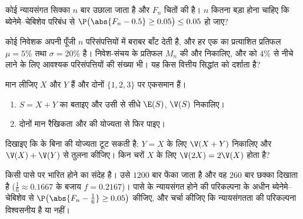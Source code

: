 \begin{exercise}[$\star$]\label{exo:g12:sums:3}
कोई न्यायसंगत सिक्का $n$ बार उछाला जाता है और $F_n$ चितों की  है। $n$ कितना बड़ा होना चाहिए कि ब्येनेमे--चेबिशेव परिबंध से $\P\bigl(\abs{F_n - 0.5} \geq 0.05\bigr) \leq 0.05$
हो जाए?
\end{exercise}

\begin{exercise}[$\star\star$]\label{exo:g12:sums:4}
कोई निवेशक अपनी पूँजी $n$  परिसंपत्तियों में बराबर बाँट देती है, और
हर एक का प्रत्याशित प्रतिफल $\mu = 5\%$ तथा  $\sigma = 20\%$ है। निवेश-संचय के
प्रतिफल $M_n$ की  और  निकालिए, और  को $4\%$ से
नीचे लाने के लिए आवश्यक परिसंपत्तियों की संख्या भी। यह किस वित्तीय सिद्धांत
को दर्शाता है?
\end{exercise}

\begin{exercise}[$\star\star$]\label{exo:g12:sums:5}
मान लीजिए $X$ और $Y$  हैं और दोनों $\{1, 2, 3\}$ पर एकसमान हैं।
\begin{enumerate}
  \item $S = X + Y$ का  बताइए और उसी से सीधे $\E(S)$, $\V(S)$ निकालिए।
  \item दोनों मान रैखिकता और  की योज्यता से फिर पाइए।
\end{enumerate}
\end{exercise}

\begin{exercise}[$\star\star$]\label{exo:g12:sums:6}
दिखाइए कि  के बिना  की योज्यता टूट सकती है: $Y = X$ के लिए $\V(X + Y)$
निकालिए और $\V(X) + \V(Y)$ से तुलना कीजिए। किन चरों $X$ के लिए $\V(2X) = 2\V(X)$ होता है?
\end{exercise}

\begin{exercise}[$\star\star$]\label{exo:g12:sums:7}
किसी पासे पर भारित होने का संदेह है। उसे $1200$ बार फेंका जाता है और वह $260$
बार छक्का दिखाता है ($\frac16 \approx 0.1667$ के बजाय $f = 0.2167$)। पासे के न्यायसंगत होने की परिकल्पना
के अधीन ब्येनेमे--चेबिशेव से $\P\bigl(\abs{F_n - \frac16} \geq 0.05\bigr)$  कीजिए, और चर्चा कीजिए कि
न्यायसंगतता की परिकल्पना विश्वसनीय है या नहीं।
\end{exercise}

